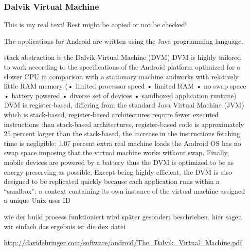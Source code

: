 \subsubsection{Dalvik Virtual Machine} \label{subsubsection:android-evolution-dvm}
This is my real text! Rest might be copied or not be checked!


%
The applications for Android are written using the Java programming language.

stack abstraction is the Dalvik Virtual Machine (DVM)\newline
DVM is highly tailored to work according to the specifications of the Android platform\newline
optimized for a slower CPU in comparison with a stationary machine andworks with relatively little RAM memory (• limited processor speed
• limited RAM
• no swap space
• battery powered
• diverse set of devices
• sandboxed application runtime)\cite{ehringerDalvik}\newline
DVM is register-based, differing from the standard Java Virtual Machine (JVM) which is stack-based, register-based architectures require fewer executed instructions than stack-based architectures, register-based code is approximately 25 percent larger than the stack-based, the increase in the instructions fetching time is negligible: 1.07 percent extra real machine loads\cite{ehringerDalvik}\newline
the Android OS has no swap space imposing that the virtual machine works without swap. Finally, mobile devices are powered by a battery thus the DVM is optimized to be as energy preserving as possible, Except being highly efficient, the DVM is also designed to be replicated quickly because each application runs within a “sandbox”: a context containing its own instance of the virtual machine assigned a unique Unix user ID\newline

wie der build process funktioniert wird später gesondert beschrieben, hier sagen wir einfach das ergebnis ist die dex datei\newline
\cite{kovachevaMaster}
%

%
\url{http://davidehringer.com/software/android/The_Dalvik_Virtual_Machine.pdf}
\cite{ehringerDalvik}
%




